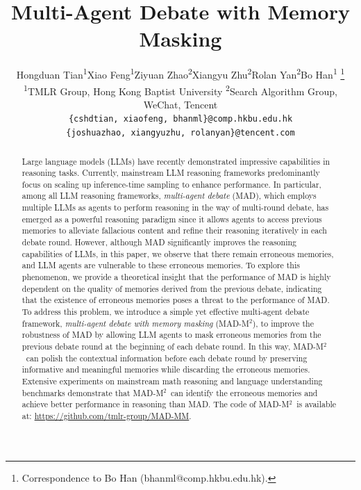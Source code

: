 \documentclass{article} %
\title{Multi-Agent Debate with Memory Masking}
\author{Hongduan Tian\textsuperscript{1}\quad Xiao Feng\textsuperscript{1}\quad Ziyuan Zhao\textsuperscript{2}\quad Xiangyu Zhu\textsuperscript{2}\quad Rolan Yan\textsuperscript{2}\quad Bo Han\textsuperscript{1} \thanks{Correspondence to Bo Han (bhanml@comp.hkbu.edu.hk).} \\
\textsuperscript{1}{TMLR Group, Hong Kong Baptist University}\quad  
\textsuperscript{2}{Search Algorithm Group, WeChat, Tencent}\\
\texttt{\{cshdtian, xiaofeng, bhanml\}@comp.hkbu.edu.hk}\\
\texttt{\{joshuazhao, xiangyuzhu, rolanyan\}@tencent.com}
}
\newcommand{\methodname}{MAD-M$^2$}
\theoremstyle{plain}
\begin{document}
\maketitle
\vspace{-12pt}
\begin{abstract}
Large language models (LLMs) have recently demonstrated impressive capabilities in reasoning tasks. Currently, mainstream LLM reasoning frameworks predominantly focus on scaling up inference-time sampling to enhance performance. In particular, among all LLM reasoning frameworks, \textit{multi-agent debate} (MAD), which employs multiple LLMs as agents to perform reasoning in the way of multi-round debate, has emerged as a powerful reasoning paradigm since it allows agents to access previous memories to alleviate fallacious content and refine their reasoning iteratively in each debate round. However, although MAD significantly improves the reasoning capabilities of LLMs, in this paper, we observe that there remain erroneous memories, and LLM agents are vulnerable to these erroneous memories. To explore this phenomenon, we provide a theoretical insight that the performance of MAD is highly dependent on the quality of memories derived from the previous debate, indicating that the existence of erroneous memories poses a threat to the performance of MAD. To address this problem, we introduce a simple yet effective multi-agent debate framework, \textit{multi-agent debate with memory masking} (\methodname), to improve the robustness of MAD by allowing LLM agents to mask erroneous memories from the previous debate round at the beginning of each debate round. In this way, \methodname\ can polish the contextual information before each debate round by preserving informative and meaningful memories while discarding the erroneous memories. Extensive experiments on mainstream math reasoning and language understanding benchmarks demonstrate that \methodname\ can identify the erroneous memories and achieve better performance in reasoning than MAD. The code of \methodname\ is available at: \href{https://github.com/tmlr-group/MAD-MM}{https://github.com/tmlr-group/MAD-MM}.
\end{abstract}
\end{document}
